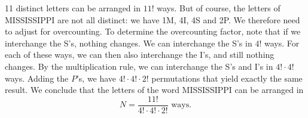 
\setcounter{theorem}{0}

\begin{exercise} [BH.1.1]
\begin{solution}
	11 distinct letters can be arranged in $11!$ ways. But of course, the letters of MISSISSIPPI are not all distinct: we have 1M, 4I, 4S and 2P. We therefore need to adjust for overcounting. To determine the overcounting factor, note that if we interchange the S's, nothing changes. We can interchange the S's in $4!$ ways. For each of these ways, we can then also interchange the I's, and still nothing changes. By the multiplication rule, we can interchange the S's and I's in $4!\cdot 4!$ ways. Adding the $P$'s, we have $4!\cdot 4!\cdot 2!$ permutations that yield exactly the same result. We conclude that the letters of the word MISSISSIPPI can be arranged in $$N=\frac{11!}{4!\cdot 4!\cdot 2!}\text{ ways.}$$
\end{solution}
\end{exercise}


